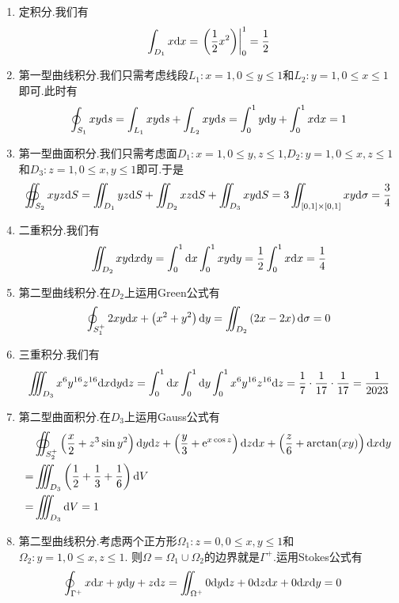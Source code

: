 \documentclass{ctexart}
\begin{document}
\begin{solution}
    \begin{enumerate}[label=\tbf{(\arabic*)}]
        \item 定积分.我们有
            \[\int_{D_1}x\mathrm{d} x=\left.\left(\dfrac12x^2\right)\right|_0^1=\dfrac12\]
        \item 第一型曲线积分.我们只需考虑线段$L_1:x=1,0\leqslant y\leqslant1$和$L_2:y=1,0\leqslant x\leqslant1$即可.此时有
            \[\oint_{S_1}xy\mathrm{d} s=\int_{L_1}xy\mathrm{d} s+\int_{L_2}xy\mathrm{d} s=\int_{0}^1y\mathrm{d} y+\int_0^1x\mathrm{d} x=1\]
        \item 第一型曲面积分.我们只需考虑面$D_1:x=1,0\leqslant y,z\leqslant 1$,$D_2:y=1,0\leqslant x,z\leqslant 1$和$D_3:z=1,0\leqslant x,y\leqslant 1$即可.于是
            \[\oiint_{S_2}xyz\mathrm{d} S
            = \iint_{D_1}yz\mathrm{d} S+\iint_{D_2}xz\mathrm{d} S+\iint_{D_3}xy\mathrm{d} S
            = 3\iint_{[0,1]\times[0,1]}xy\mathrm{d}\sigma
            = \dfrac{3}{4}\]
        \item 二重积分.我们有
            \[\iint_{D_2}xy\mathrm{d} x\mathrm{d} y=\int_0^1\mathrm{d} x\int_0^1xy\mathrm{d} y=\dfrac12\int_0^1x\mathrm{d} x=\dfrac14\]
        \item 第二型曲线积分.在$D_2$上运用Green公式有
            \[\oint_{S_1^+}2xy\mathrm{d} x+\left(x^2+y^2\right)\mathrm{d} y
            =\iint_{D_2}\left(2x-2x\right)\mathrm{d}\sigma=0\]
        \item 三重积分.我们有
            \[\iiint_{D_3}x^6y^{16}z^{16}\mathrm{d} x\mathrm{d} y\mathrm{d} z
            =\int_0^1\mathrm{d} x\int_0^1\mathrm{d} y\int_0^1x^6y^{16}z^{16}\mathrm{d} z=\dfrac17\cdot\dfrac{1}{17}\cdot\dfrac{1}{17}=\dfrac{1}{2023}\]
        \item 第二型曲面积分.在$D_3$上运用Gauss公式有
            \[\begin{aligned}
                &\oiint_{S_2^+}\left(\dfrac x2+z^3\sin y^2\right)\mathrm{d} y\mathrm{d} z+\left(\dfrac y3+\mathrm{e}^{x\cos z}\right)\mathrm{d} z\mathrm{d} x+\left(\dfrac z6+\arctan(xy)\right)\mathrm{d} x\mathrm{d} y \\
                =&\iiint_{D_3}\left(\dfrac12+\dfrac13+\dfrac16\right)\mathrm{d} V \\
                =&\iiint_{D_3}\mathrm{d} V=1
            \end{aligned}\]
        \item 第二型曲线积分.考虑两个正方形$\Omega_1:z=0,0\leqslant x,y\leqslant1$和$\Omega_2:y=1,0\leqslant x,z\leqslant 1$.%
            则$\Omega=\Omega_1\cup\Omega_2$的边界就是$\Gamma^+$.运用Stokes公式有
            \[\begin{aligned}
                \oint_{\Gamma^+}x\mathrm{d} x+y\mathrm{d} y+z\mathrm{d} z
                &= \iint_{\Omega^+}0\mathrm{d} y\mathrm{d} z+0\mathrm{d} z\mathrm{d} x+0\mathrm{d} x\mathrm{d} y=0
            \end{aligned}\]

    \end{enumerate}
\end{solution}
\end{document}

